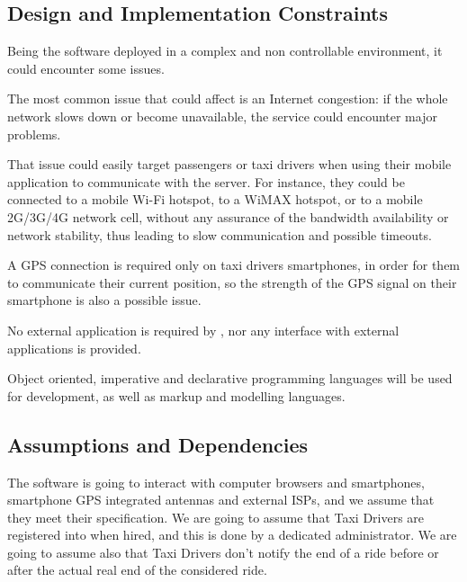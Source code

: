 \subsection{Design and Implementation Constraints}
Being the software deployed in a complex and non controllable environment, it could encounter some issues.\par
The most common issue that could affect \myTaxiService{} is an Internet congestion: if the whole network slows down or become unavailable, the service could encounter major problems.\par
That issue could easily target passengers or taxi drivers when using their mobile application to communicate with the server.
For instance, they could be connected to a mobile Wi-Fi hotspot, to a WiMAX hotspot, or to a mobile 2G/3G/4G network cell, without any assurance of the bandwidth availability or network stability, thus leading to slow communication and possible timeouts.\par
A GPS connection is required only on taxi drivers smartphones, in order for them to communicate their current position, so the strength of the GPS signal on their smartphone is also a possible issue.\par
No external application is required by \myTaxiService{}, nor any interface with external applications is provided.\par
Object oriented, imperative and declarative programming languages will be used for \myTaxiService{} development, as well as markup and modelling languages.\par
\subsection{Assumptions and Dependencies}
The software is going to interact with computer browsers and smartphones, smartphone GPS integrated antennas and external ISPs, and we assume that they meet their specification.
We are going to assume that Taxi Drivers are registered into \myTaxiService{} when hired, and this is done by a dedicated administrator.
We are going to assume also that Taxi Drivers don't notify the end of a ride before or after the actual real end of the considered ride.
